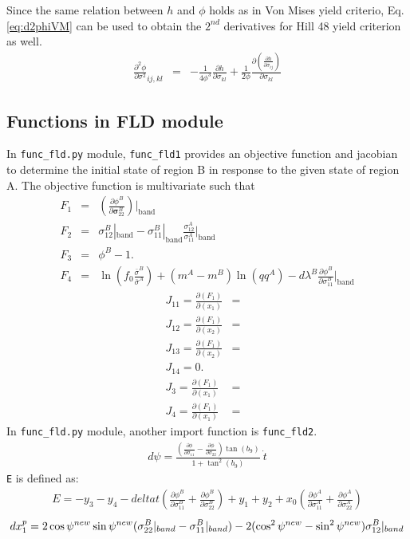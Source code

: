 \documentclass[12pt]{amsart}
\begin{document}
Since the same relation between $h$ and $\phi$ holds as in Von Mises yield criterio, Eq. \ref{eq:d2phiVM} can be used to obtain the $2^{nd}$ derivatives for Hill 48 yield criterion as well.
\begin{eqnarray}
  \label{eq:d2phiHill}
  \frac{\partial^2\phi}{\partial\sigma^2}_{ij,kl}&=& - \frac{1}{4\phi^3} \frac{\partial h}{\partial\sigma_{kl}}  + \frac{1}{2\phi}  \frac{\partial(  \frac{\partial h}{\partial \sigma_{ij}}   )}{\partial\sigma_{kl}}
\end{eqnarray}

\subsection{Functions in FLD module}
In \verb|func_fld.py| module, \verb|func_fld1| provides an objective function and jacobian to determine the initial state of region B in response to the given state of region A.
The objective function is multivariate such that
\begin{eqnarray}
  \label{eq:objf_func_fld1}
  F_1&=& (\frac{\partial \phi^B}{\partial \boldsymbol{\sigma}^B_{22}})|_\text{band}\\
  F_2&=& \sigma_{12}^B|_\text{band}- \sigma_{11}^B|_\text{band} \frac{\sigma_{12}^A}{\sigma_{11}^A}|_\text{band}\\
  F_3&=& \phi^B- 1. \\
  F_4&=& \ln(f_0 \frac{\bar{\sigma}^B}{\bar{\sigma}^A}) + (m^A-m^B) \ln(qq^A) - d\lambda^B \frac{\partial \phi^B}{\partial \sigma^B_{11}}|_\text{band}
\end{eqnarray}
\begin{eqnarray}
  \label{eq:jacob_func_fld1}
  J_{11}=\frac{\partial(F_1)}{\partial(x_1)}&=&  \\
  J_{12}=\frac{\partial(F_1)}{\partial(x_2)}&=&   \\
  J_{13}=\frac{\partial(F_1)}{\partial(x_2)}&=&   \\
  J_{14}=0.                                 &&    \\
  J_{3}=\frac{\partial(F_1)}{\partial(x_1)}&=&    \\
  J_{4}=\frac{\partial(F_1)}{\partial(x_1)}&=&
\end{eqnarray}
In \verb|func_fld.py| module, another import function is \verb|func_fld2|.
\begin{eqnarray}
  \label{eq:dpsi}
  d\psi=\frac{ (\frac{\partial \phi}{\partial\sigma_{11}}-\frac{\partial \phi}{\partial\sigma_{22}}) \tan(b_9)}    {1+\tan^2(b_9)}\  \dot{t}
\end{eqnarray}
\verb|E| is defined as:
\begin{eqnarray}
  \label{eq:yancien}
  E = -y_3 - y_4 - deltat (\frac{\partial \phi^B}{\partial\sigma^B_{11}}+\frac{\partial \phi^B}{\partial\sigma^B_{22}})+y_1+y_2+x_0(\frac{\partial \phi^A}{\partial\sigma^A_{11}}+\frac{\partial \phi^A}{\partial\sigma^A_{22}})
\end{eqnarray}
\begin{equation}
  \label{eq:dxp}
  dx^p_1=2\cos\psi^{new}\sin\psi^{new}(\sigma_{22}^B|_{band}-\sigma_{11}^B|_{band}) \\
  - 2 (\cos^2\psi^{new}-\sin^2\psi^{new}) \sigma_{12}^B|_{band}
\end{equation}
\end{document}

